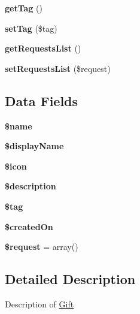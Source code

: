 \begin{DoxyCompactItemize}
\item 
\hypertarget{class_gift_ab86ba36154b20e6bbfa3ba705f12f9d6}{{\bfseries get\+Tag} ()}\label{class_gift_ab86ba36154b20e6bbfa3ba705f12f9d6}

\item 
\hypertarget{class_gift_a29ac399818206c510be536c2dea9540c}{{\bfseries set\+Tag} (\$tag)}\label{class_gift_a29ac399818206c510be536c2dea9540c}

\item 
\hypertarget{class_gift_ae5c6a2b2c05ee9237d9971ce7b976403}{{\bfseries get\+Requests\+List} ()}\label{class_gift_ae5c6a2b2c05ee9237d9971ce7b976403}

\item 
\hypertarget{class_gift_ab06859c6e8f8417fdfb71333425ea388}{{\bfseries set\+Requests\+List} (\$request)}\label{class_gift_ab06859c6e8f8417fdfb71333425ea388}

\end{DoxyCompactItemize}
\subsection*{Data Fields}
\begin{DoxyCompactItemize}
\item 
\hypertarget{class_gift_ab2fc40d43824ea3e1ce5d86dee0d763b}{{\bfseries \$name}}\label{class_gift_ab2fc40d43824ea3e1ce5d86dee0d763b}

\item 
\hypertarget{class_gift_ac1b12cd5f2bbc3d7dcff91e4e27dfee6}{{\bfseries \$display\+Name}}\label{class_gift_ac1b12cd5f2bbc3d7dcff91e4e27dfee6}

\item 
\hypertarget{class_gift_ac13ca58494b5ebc7e5f1ded33256c9e9}{{\bfseries \$icon}}\label{class_gift_ac13ca58494b5ebc7e5f1ded33256c9e9}

\item 
\hypertarget{class_gift_a87b032cba06009e3467abf1c8018d960}{{\bfseries \$description}}\label{class_gift_a87b032cba06009e3467abf1c8018d960}

\item 
\hypertarget{class_gift_a81d5015d41ed8ec66e9db8cdc5db9555}{{\bfseries \$tag}}\label{class_gift_a81d5015d41ed8ec66e9db8cdc5db9555}

\item 
\hypertarget{class_gift_a980da9bfdce6ade7abd3568e89f80013}{{\bfseries \$created\+On}}\label{class_gift_a980da9bfdce6ade7abd3568e89f80013}

\item 
\hypertarget{class_gift_abb35c8495a232b510389fa6d7b15d38a}{{\bfseries \$request} = array()}\label{class_gift_abb35c8495a232b510389fa6d7b15d38a}

\end{DoxyCompactItemize}


\subsection{Detailed Description}
Description of \hyperlink{class_gift}{Gift} 